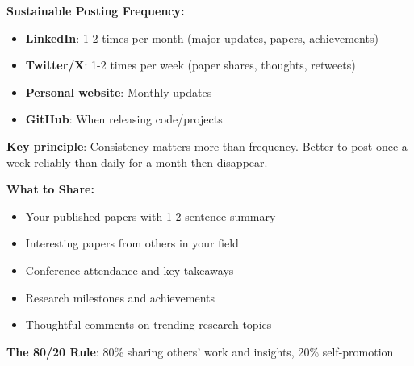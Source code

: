 \documentclass[11pt,a4paper]{article}
\begin{document}
\begin{tcolorbox}[colback=yellow!5,colframe=orange!60,title={Realistic Update Schedule}]
\textbf{Sustainable Posting Frequency:}
\begin{itemize}[leftmargin=1.5em]
    \item \textbf{LinkedIn}: 1-2 times per month (major updates, papers, achievements)
    \item \textbf{Twitter/X}: 1-2 times per week (paper shares, thoughts, retweets)
    \item \textbf{Personal website}: Monthly updates
    \item \textbf{GitHub}: When releasing code/projects
\end{itemize}

\textbf{Key principle}: Consistency matters more than frequency. Better to post once a week reliably than daily for a month then disappear.
\end{tcolorbox}

\begin{tcolorbox}[colback=blue!5,colframe=blue!40,title={Content Strategy}]
\textbf{What to Share:}
\begin{itemize}[leftmargin=1.5em]
    \item Your published papers with 1-2 sentence summary
    \item Interesting papers from others in your field
    \item Conference attendance and key takeaways
    \item Research milestones and achievements
    \item Thoughtful comments on trending research topics
\end{itemize}

\textbf{The 80/20 Rule}: 80\% sharing others' work and insights, 20\% self-promotion
\end{tcolorbox}
\end{document}
